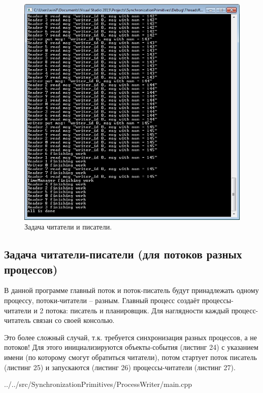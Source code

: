 \documentclass[a4paper, 12pt]{article}		%
\begin{document}
\begin{figure}[h!]
\centering
\includegraphics[scale=1]{res/006}
\caption{Задача читатели и писатели.}
\end{figure}


\newpage
\subsection{Задача читатели-писатели (для потоков разных процессов)}

В данной программе главный поток и поток-писатель будут принадлежать одному процессу, потоки-читатели – разным. Главный процесс создаёт процессы-читатели и 2 потока: писатель и планировщик. Для наглядности каждый процесс-читатель связан со своей консолью.

Это более сложный случай, т.к. требуется синхронизация разных процессов, а не потоков! Для этого инициализируются объекты-события (листинг 24) с указанием имени (по которому смогут обратиться читатели), потом стартует поток писатель (листинг 25) и запускаются (листинг 26) процессы-читатели (листинг 27)\cite{Dushutina}.


{../../src/SynchronizationPrimitives/ProcessWriter/main.cpp}
\end{document}
